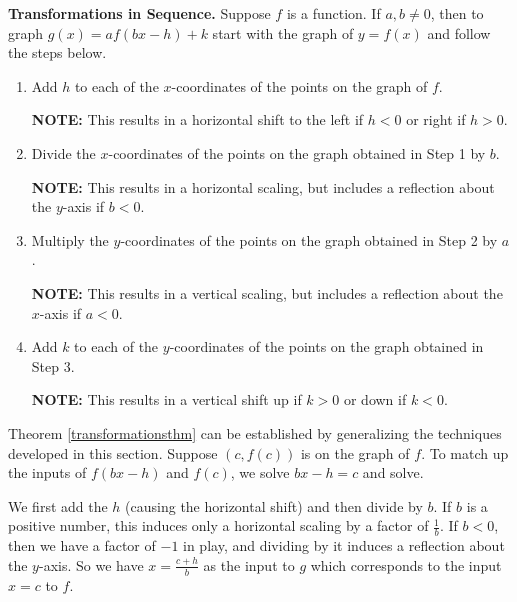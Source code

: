 \documentclass{ximera}
\begin{document}
\colorbox{ResultColor}{\bbm


\begin{theorem} \label{transformationsthm}\textbf{Transformations in Sequence.}  Suppose $f$ is a function.  If $a, b \neq 0$, then to graph $g(x) = a f(bx-h)+k$ start with the graph of $y=f(x)$ and follow the steps below.

\begin{enumerate}

\item  Add $h$ to each of the $x$-coordinates of the points on the graph of $f$.  

\textbf{NOTE:} This results in a horizontal shift to the left if $h < 0$ or right if $h > 0$.

\item  Divide the $x$-coordinates of the points on the graph obtained in Step 1 by $b$.  

\textbf{NOTE:} This results in a horizontal scaling, but includes a reflection about the $y$-axis if $b < 0$.

\item  Multiply the $y$-coordinates of the points on the graph obtained in Step 2 by $a$.   

\textbf{NOTE:} This results in a vertical scaling, but  includes a reflection about the $x$-axis if $a < 0$.

\item  Add $k$ to each of the $y$-coordinates of the points on the graph obtained in Step 3.  

\textbf{NOTE:} This results in a vertical shift up if $k > 0$ or down if $k < 0$.

\end{enumerate}

\end{theorem}

\ebm}

\bigskip

Theorem \ref{transformationsthm} can be established by generalizing the techniques developed in this section.  Suppose $(c,f(c))$ is on the graph of $f$. To match up the inputs of $f(bx-h)$ and $f(c)$, we solve $bx-h = c$ and solve.  

\smallskip

We first add the $h$ (causing the horizontal shift) and then divide by $b$.  If $b$ is a positive number, this induces only a horizontal scaling by a factor of $\frac{1}{b}$.  If  $b<0$, then we have a factor of $-1$ in play, and dividing by it induces a reflection about the $y$-axis.  So we have $x = \frac{c+h}{b}$ as the input to $g$ which corresponds to the input $x=c$ to $f$.  
\end{document}
